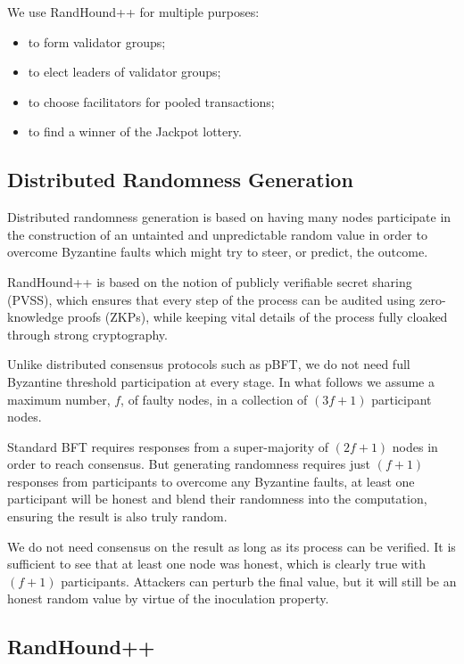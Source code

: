 \documentclass[a4paper, 10pt, conference]{ieeeconf}
\begin{document}
We use RandHound++ for multiple purposes:

\begin{itemize}
	\item {to form validator groups;}
	\item {to elect leaders of validator groups;} 
	\item {to choose facilitators for pooled transactions;}
	\item {to find a winner of the Jackpot lottery.}
\end{itemize}

\subsection{Distributed Randomness Generation}

Distributed randomness generation is based on having many nodes participate in the construction of an untainted and unpredictable random value in order to overcome Byzantine faults which might try to steer, or predict, the outcome.

RandHound++ is based on the notion of publicly verifiable secret sharing (PVSS)\cite{c15}, which ensures that every step of the process can be audited using zero-knowledge proofs (ZKPs), while keeping vital details of the process fully cloaked through strong cryptography.

Unlike distributed consensus protocols such as pBFT, we do not need full Byzantine threshold participation at every stage. In what follows we assume a maximum number, $f$, of faulty nodes, in a collection of $(3 f + 1)$ participant nodes. 

Standard BFT requires responses from a super-majority of $(2 f + 1)$ nodes in order to reach consensus. But generating randomness requires just $(f + 1)$ responses from participants to overcome any Byzantine faults, at least one participant will be honest and blend their randomness into the computation, ensuring the result is also truly random. 

We do not need consensus on the result as long as its process can be verified. It is sufficient to see that at least one node was honest, which is clearly true with $(f + 1)$ participants. Attackers can perturb the final value, but it will still be an honest random value by virtue of the inoculation property.

\subsection{RandHound++}
\end{document}
